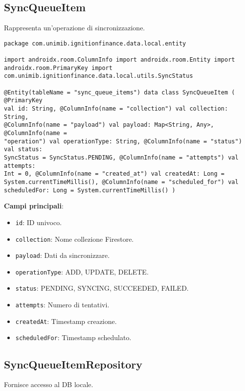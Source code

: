 \subsection{SyncQueueItem}\label{subsec:syncqueueitem} Rappresenta un'operazione
di sincronizzazione.

\begin{lstlisting}[caption=SyncQueueItem.kt, label=lst:syncqueueitem, basicstyle=\ttfamily\scriptsize, breaklines=true, breakatwhitespace=true, tabsize=4]
package com.unimib.ignitionfinance.data.local.entity

import androidx.room.ColumnInfo import androidx.room.Entity import
androidx.room.PrimaryKey import
com.unimib.ignitionfinance.data.local.utils.SyncStatus

@Entity(tableName = "sync_queue_items") data class SyncQueueItem ( @PrimaryKey
val id: String, @ColumnInfo(name = "collection") val collection: String,
@ColumnInfo(name = "payload") val payload: Map<String, Any>, @ColumnInfo(name =
"operation") val operationType: String, @ColumnInfo(name = "status") val status:
SyncStatus = SyncStatus.PENDING, @ColumnInfo(name = "attempts") val attempts:
Int = 0, @ColumnInfo(name = "created_at") val createdAt: Long =
System.currentTimeMillis(), @ColumnInfo(name = "scheduled_for") val
scheduledFor: Long = System.currentTimeMillis() )
\end{lstlisting}

\textbf{Campi principali}:
\begin{itemize}
    \item \texttt{id}: ID univoco.
    \item \texttt{collection}: Nome collezione Firestore.
    \item \texttt{payload}: Dati da sincronizzare.
    \item \texttt{operationType}: ADD, UPDATE, DELETE\@.
    \item \texttt{status}: PENDING, SYNCING, SUCCEEDED, FAILED\@.
    \item \texttt{attempts}: Numero di tentativi.
    \item \texttt{createdAt}: Timestamp creazione.
    \item \texttt{scheduledFor}: Timestamp schedulato.
\end{itemize}

\subsection{SyncQueueItemRepository}\label{subsec:syncqueueitemrepository}
Fornisce accesso al DB locale.

